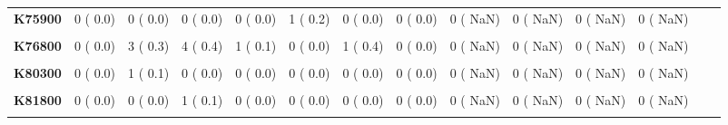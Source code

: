 \documentclass[
]{article}
\begin{document}
\begin{table}[H]
\begin{tabular}[t]{>{\raggedright\arraybackslash}p{5em}ccccccccccccc}
\textbf{K75900} & 0 (  0.0) & 0 (  0.0) & 0 (  0.0) & 0 (  0.0) & 1 (  0.2) & 0 (  0.0) & 0 (  0.0) & 0 (  NaN) & 0 (  NaN) & 0 (  NaN) & 0 (  NaN) &  & \\
\textbf{\cellcolor{gray!10}{K76100}} & \cellcolor{gray!10}{0 (  0.0)} & \cellcolor{gray!10}{1 (  0.1)} & \cellcolor{gray!10}{0 (  0.0)} & \cellcolor{gray!10}{0 (  0.0)} & \cellcolor{gray!10}{0 (  0.0)} & \cellcolor{gray!10}{0 (  0.0)} & \cellcolor{gray!10}{0 (  0.0)} & \cellcolor{gray!10}{0 (  NaN)} & \cellcolor{gray!10}{0 (  NaN)} & \cellcolor{gray!10}{0 (  NaN)} & \cellcolor{gray!10}{0 (  NaN)} & \cellcolor{gray!10}{} & \cellcolor{gray!10}{}\\
\textbf{K76800} & 0 (  0.0) & 3 (  0.3) & 4 (  0.4) & 1 (  0.1) & 0 (  0.0) & 1 (  0.4) & 0 (  0.0) & 0 (  NaN) & 0 (  NaN) & 0 (  NaN) & 0 (  NaN) &  & \\
\textbf{\cellcolor{gray!10}{K80200}} & \cellcolor{gray!10}{0 (  0.0)} & \cellcolor{gray!10}{1 (  0.1)} & \cellcolor{gray!10}{1 (  0.1)} & \cellcolor{gray!10}{0 (  0.0)} & \cellcolor{gray!10}{0 (  0.0)} & \cellcolor{gray!10}{0 (  0.0)} & \cellcolor{gray!10}{0 (  0.0)} & \cellcolor{gray!10}{0 (  NaN)} & \cellcolor{gray!10}{0 (  NaN)} & \cellcolor{gray!10}{0 (  NaN)} & \cellcolor{gray!10}{0 (  NaN)} & \cellcolor{gray!10}{} & \cellcolor{gray!10}{}\\
\textbf{K80300} & 0 (  0.0) & 1 (  0.1) & 0 (  0.0) & 0 (  0.0) & 0 (  0.0) & 0 (  0.0) & 0 (  0.0) & 0 (  NaN) & 0 (  NaN) & 0 (  NaN) & 0 (  NaN) &  & \\
\textbf{\cellcolor{gray!10}{K81000}} & \cellcolor{gray!10}{1 (  0.1)} & \cellcolor{gray!10}{0 (  0.0)} & \cellcolor{gray!10}{0 (  0.0)} & \cellcolor{gray!10}{0 (  0.0)} & \cellcolor{gray!10}{1 (  0.2)} & \cellcolor{gray!10}{0 (  0.0)} & \cellcolor{gray!10}{0 (  0.0)} & \cellcolor{gray!10}{0 (  NaN)} & \cellcolor{gray!10}{0 (  NaN)} & \cellcolor{gray!10}{0 (  NaN)} & \cellcolor{gray!10}{0 (  NaN)} & \cellcolor{gray!10}{} & \cellcolor{gray!10}{}\\
\textbf{K81800} & 0 (  0.0) & 0 (  0.0) & 1 (  0.1) & 0 (  0.0) & 0 (  0.0) & 0 (  0.0) & 0 (  0.0) & 0 (  NaN) & 0 (  NaN) & 0 (  NaN) & 0 (  NaN) &  & \\
\textbf{\cellcolor{gray!10}{K81900}} & \cellcolor{gray!10}{1 (  0.1)} & \cellcolor{gray!10}{0 (  0.0)} & \cellcolor{gray!10}{1 (  0.1)} & \cellcolor{gray!10}{1 (  0.1)} & \cellcolor{gray!10}{2 (  0.4)} & \cellcolor{gray!10}{1 (  0.4)} & \cellcolor{gray!10}{0 (  0.0)} & \cellcolor{gray!10}{0 (  NaN)} & \cellcolor{gray!10}{0 (  NaN)} & \cellcolor{gray!10}{0 (  NaN)} & \cellcolor{gray!10}{0 (  NaN)} & \cellcolor{gray!10}{} & \cellcolor{gray!10}{}\\

\end{tabular}
\end{table}
\end{document}
